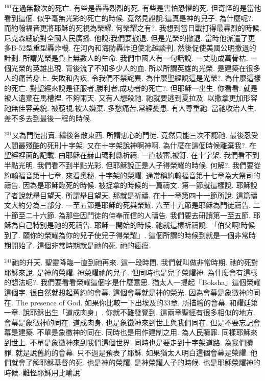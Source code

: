 \documentclass{book}
\begin{document}
$^{161}$在過無數次的死亡.
有些是轟轟烈烈的死.
有些是害怕恐懼的死.
但奇怪的是當他看到這個.
似乎毫無光彩的死亡的時候.
竟然見證說:這真是神的兒子.
為什麼呢?.
而約翰福音更將耶穌的死視為榮耀.
何榮耀之有?.
我想到當日戰打得最轟烈的時候.
尼克森總統對全國人民廣播.
他說:我們要撤退.
但是光榮的撤退.
當時他派遣了更多B-52型重型轟炸機.
在河內和海防轟炸迫使北越談判.
然後促使美國公明撤退的計劃.
所謂光榮是負上無數人的生命.
我們中國人有一句話說.
一丈功成萬骨枯.
一個光榮的英雄出現.
背後流了不知多少人的血.
所以所謂英雄的光榮.
是建築在很多人的痛苦身上.
失敗和內疚.
令我們不禁詫異.
為什麼聖經說這是光榮?.
為什麼這樣的死亡.
對聖經來說是征服者,勝利者,成功者的死亡?.
但耶穌一出生.
你看看.
就是被人遺棄在馬槽裡.
不夠兩天.
又有人想殺祂.
祂就要逃到夏拉及.
以撒拿更加形容祂無佳容美貌.
被藐視,被人嫌棄.
多愁痛苦,常經憂患.
有人尊重祂.
當祂收治人生.
差不多去到最後一程的時候.

$^{201}$又為門徒出賣.
繼後各散東西.
所謂忠心的門徒.
竟然只能三次不認祂.
最後忍受人間最殘酷的死刑十字架.
又在十字架說神啊神啊.
為什麼在這個時候離棄我?.
在聖經裡面的記載.
由耶穌在赫山瑪利縣祈禱.
一直被審,被釘.
在十字架.
我們看不到半點光明.
我們看不到半點光彩.
但耶穌說正是人子得榮耀的時候.
何解?.
我們要從約翰福音第十七章.
來看奧秘.
十字架的榮耀.
通常稱約翰福音第十七章為大祭司的禱告.
因為是耶穌臨死的時候.
被捉拿的時候的一篇禱文.
第一節就這樣說.
耶穌說了者說就舉目望天.
所謂舉目望天.
那就是祈禱.
在十一章第四十一節所說.
這篇禱文大約分為三部分.
一至五節是耶穌的死與榮耀.
六至十九節是耶穌為門徒禱告.
二十節至二十六節.
為那些因門徒的侍奉而信的人禱告.
我們要去研讀第一至五節.
耶穌為自己特別是祂的死禱告.
耶穌一開始的時候.
祂就這樣祈禱說.
「伯父啊!時候到了.
願你的榮耀為你的兒子使兒子得榮耀」.
這個所謂的時候到就是一個非常時期開始了.
這個非常時期就是祂的死.
祂的瘋瘟.

$^{241}$祂的升天.
聖靈降臨一直到祂再來.
這一段時間.
我們就叫做非常時期.
祂的死對耶穌來說.
是神的榮耀.
神榮耀祂的兒子.
但同時也是兒子榮耀神.
為什麼會有這樣的想法呢?.
我們要看看榮耀這個字是什麼意思.
猶太人一提起「Boksha」這個榮耀這個字.
很自然就想起舊約的會幕.
這個會幕就是神的榮光.
因為會幕是象徵神的同在.
The presence of God.
如果你比較一下出埃及的33章.
所描繪的會幕.
和耀廷第一章.
說耶穌出生「道成肉身」.
你就不難發覺到.
這兩章聖經有很多相似的地方.
會幕是象徵神的同在.
道成肉身.
也是象徵神來到世上與我們同在.
但是不要忘記會幕是建築.
不單是象徵神的同在.
同時也是用作建制之用.
為人民贖罪.
同樣耶穌來到世上.
不單是象徵神來到我們這個世界.
同時也是要走到十字架道路.
為我們贖罪.
就是說舊約的會幕.
只不過是預表了耶穌.
如果猶太人明白這個會幕是榮耀.
他們就會了解耶穌基督的死.
也是神的榮耀.
是神榮耀人子的時候.
也是耶穌榮耀神的時候.
難怪耶穌用比喻說.
\end{document}
